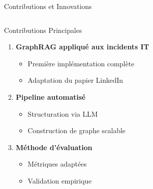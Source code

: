 \documentclass[10pt, aspectratio=169]{beamer}
\begin{document}
\begin{frame}{Contributions et Innovations}
    \begin{columns}[T]
        \begin{column}{0.5\textwidth}
            \begin{block}{Contributions Principales}
                \begin{enumerate}
                    \item \textbf{GraphRAG appliqué aux incidents IT}
                    \begin{itemize}
                        \footnotesize
                        \item Première implémentation complète
                        \item Adaptation du papier LinkedIn
                    \end{itemize}
                    \item \textbf{Pipeline automatisé}
                    \begin{itemize}
                        \footnotesize
                        \item Structuration via LLM
                        \item Construction de graphe scalable
                    \end{itemize}
                    \item \textbf{Méthode d'évaluation}
                    \begin{itemize}
                        \footnotesize
                        \item Métriques adaptées
                        \item Validation empirique
                    \end{itemize}
                \end{enumerate}
            \end{block}
        \end{column}
        

\end{columns}
\end{frame}
\end{document}
